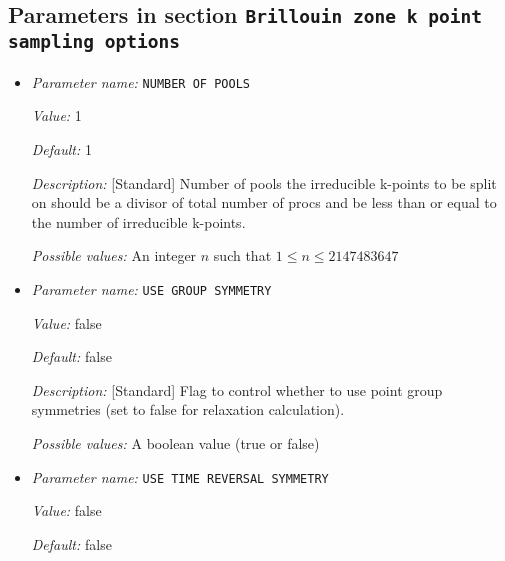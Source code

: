 \subsection{Parameters in section \tt Brillouin zone k point sampling options}
\label{parameters:Brillouin_20zone_20k_20point_20sampling_20options}

\begin{itemize}
\item {\it Parameter name:} {\tt NUMBER OF POOLS}
\label{parameters:Brillouin zone k point sampling options/NUMBER OF POOLS}
\label{parameters:Brillouin_20zone_20k_20point_20sampling_20options/NUMBER_20OF_20POOLS}


{\it Value:} 1


{\it Default:} 1


{\it Description:} [Standard] Number of pools the irreducible k-points to be split on should be a divisor of total number of procs and be less than or equal to the number of irreducible k-points.


{\it Possible values:} An integer $n$ such that $1\leq n \leq 2147483647$
\item {\it Parameter name:} {\tt USE GROUP SYMMETRY}
\label{parameters:Brillouin zone k point sampling options/USE GROUP SYMMETRY}
\label{parameters:Brillouin_20zone_20k_20point_20sampling_20options/USE_20GROUP_20SYMMETRY}


{\it Value:} false


{\it Default:} false


{\it Description:} [Standard] Flag to control whether to use point group symmetries (set to false for relaxation calculation).


{\it Possible values:} A boolean value (true or false)
\item {\it Parameter name:} {\tt USE TIME REVERSAL SYMMETRY}
\label{parameters:Brillouin zone k point sampling options/USE TIME REVERSAL SYMMETRY}
\label{parameters:Brillouin_20zone_20k_20point_20sampling_20options/USE_20TIME_20REVERSAL_20SYMMETRY}


{\it Value:} false


{\it Default:} false



\end{itemize}
